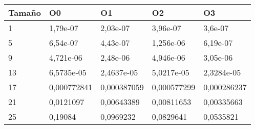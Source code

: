 \begin{tabular}{|l|l|l|l|l|}
	\hline
	Tamaño & O0 & O1 & O2 & O3 \\
	\hline
	\hline
	1 & 1,79e-07 & 2,03e-07 & 3,96e-07 & 3,6e-07 \\
	\hline
	5 & 6,54e-07 & 4,43e-07 & 1,256e-06 & 6,19e-07 \\
	\hline
	9 & 4,721e-06 & 2,48e-06 & 4,946e-06 & 3,05e-06 \\
	\hline
	13 & 6,5735e-05 & 2,4637e-05 & 5,0217e-05 & 2,3284e-05 \\
	\hline
	17 & 0,000772841 & 0,000387059 & 0,000577299 & 0,000286237 \\
	\hline
	21 & 0,0121097 & 0,00643389 & 0,00811653 & 0,00335663 \\
	\hline
	25 & 0,19084 & 0,0969232 & 0,0829641 & 0,0535821 \\
	\hline
\end{tabular}
